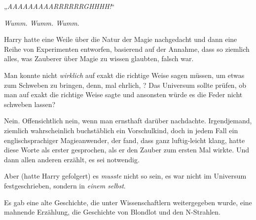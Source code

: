 „\emph{AAAAAAAAARRRRRRGHHHH!}“

\emph{Wumm. Wumm. Wumm.}

Harry hatte eine Weile über die Natur der Magie nachgedacht und dann eine Reihe von Experimenten entworfen, basierend auf der Annahme, dass so ziemlich alles, was Zauberer über Magie zu wissen glaubten, falsch war.

Man konnte nicht \emph{wirklich}  auf exakt die richtige Weise sagen müssen, um etwas zum Schweben zu bringen, denn, mal ehrlich, ? Das Universum sollte prüfen, ob man  auf exakt die richtige Weise sagte und ansonsten würde es die Feder nicht schweben lassen?

Nein. Offensichtlich nein, wenn man ernsthaft darüber nachdachte. Irgendjemand, ziemlich wahrscheinlich buchstäblich ein Vorschulkind, doch in jedem Fall ein englischsprachiger Magieanwender, der fand, dass  ganz luftig-leicht klang, hatte diese Worte als erster gesprochen, als er den Zauber zum ersten Mal wirkte. Und dann allen anderen erzählt, es sei notwendig.

Aber (hatte Harry gefolgert) es \emph{musste} nicht so sein, es war nicht im Universum festgeschrieben, sondern in \emph{einem selbst}.

Es gab eine alte Geschichte, die unter Wissenschaftlern weitergegeben wurde, eine mahnende Erzählung, die Geschichte von Blondlot und den N-Strahlen.

